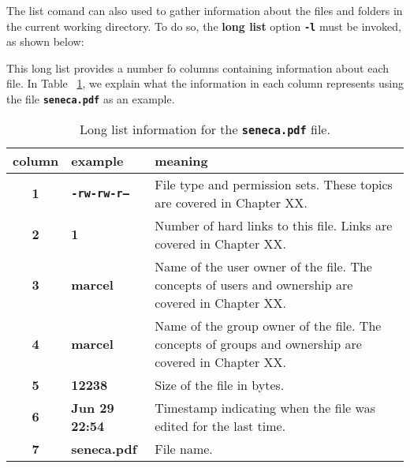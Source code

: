 The list comand can also used to gather information about the files and folders in the current working directory. To do so, the \textbf{long list} option \textbf{\texttt{-l}} must be invoked, as shown below:
This long list provides a number fo columns containing information about each file. In Table~ \ref{tab:ch2_list}, we explain what the information in each column represents using the file \textbf{\texttt{seneca.pdf}} as an example.

\begin{table}[!htbp]
   \myfloatalign
   \begin{tabularx}{\textwidth}{cXp{70mm}} \toprule
   \textbf{column} & \textbf{example} & \textbf{meaning} \\ \bottomrule
   \textbf{1} & \textbf{\texttt{-rw-rw-r--}} & File type and permission sets. These topics are covered in Chapter XX.\\
   \textbf{2} & \textbf{1} & Number of hard links to this file. Links are covered in Chapter XX.\\
   \textbf{3} & \textbf{marcel} & Name of the user owner of the file. The concepts of users and ownership are covered in Chapter XX.\\
   \textbf{4} & \textbf{marcel} & Name of the group owner of the file. The concepts of groups and ownership are covered in Chapter XX.\\
   \textbf{5} & \textbf{12238} & Size of the file in bytes.\\
   \textbf{6} & \textbf{Jun 29 22:54} & Timestamp indicating when the file was edited for the last time.\\
   \textbf{7} & \textbf{seneca.pdf} & File name.\\
   \bottomrule
   \end{tabularx}
\caption{Long list information for the \textbf{\texttt{seneca.pdf}} file.}
\label{tab:ch2_list}
\end{table}



